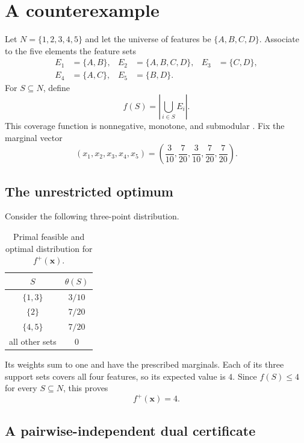 \section{A counterexample}

Let $N=\{1,2,3,4,5\}$ and let the universe of features be
$\{A,B,C,D\}$.  Associate to the five elements the feature sets
\[
\begin{aligned}
 E_1&=\{A,B\}, & E_2&=\{A,B,C,D\}, & E_3&=\{C,D\},\\
 E_4&=\{A,C\}, & E_5&=\{B,D\}.&&
\end{aligned}
\]
For $S\subseteq N$, define
\[
  f(S)=\left|\bigcup_{i\in S}E_i\right|.
\]
This coverage function is nonnegative, monotone, and submodular
\cite{bach2013}.  Fix the marginal vector
\[
  (x_1,x_2,x_3,x_4,x_5)
  =\left(\frac3{10},\frac7{20},\frac3{10},\frac7{20},\frac7{20}\right).
\]

\subsection{The unrestricted optimum}

Consider the following three-point distribution.
\begin{table}[h]
\centering
\caption{Primal feasible and optimal distribution for $f^+(\boldsymbol{x})$.}
\label{tab:primal}
\begin{tabular}{cc}
$S$ & $\theta(S)$\\ \hline
$\{1,3\}$ & $3/10$\\
$\{2\}$ & $7/20$\\
$\{4,5\}$ & $7/20$\\
all other sets & $0$
\end{tabular}
\end{table}
Its weights sum to one and have the prescribed marginals.  Each of its three
support sets covers all four features, so its expected value is $4$.  Since
$f(S)\leq4$ for every $S\subseteq N$, this proves
\[
  f^+(\boldsymbol{x})=4.
\]

\subsection{A pairwise-independent dual certificate}

